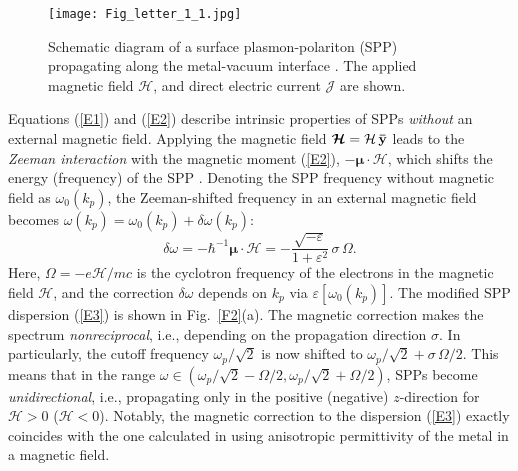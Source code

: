 \documentclass[9pt,twocolumn,twoside]{osajnl}
\begin{document}
\begin{figure}[t]
\centering
\texttt{[image: Fig\_letter\_1\_1.jpg]}
\caption{Schematic diagram of a surface plasmon-polariton (SPP) propagating along the metal-vacuum interface \cite{Zayats,Maier}. The applied magnetic field ${\bm{\mathcal H}}$, and direct electric current ${\bm{\mathcal J}}$ are shown.}
\label{F1}
\end{figure}

Equations (\ref{E1}) and (\ref{E2}) describe intrinsic properties of SPPs {\it without} an external magnetic field. Applying the magnetic field ${{\bm{\mathcal H}}} = {\mathcal H}\,{\bf{\bar y}}$ leads to the {\it Zeeman interaction} with the magnetic moment (\ref{E2}), $- \bm{\mu}  \cdot {{\bm{\mathcal H}}}$, which shifts the energy (frequency) of the SPP \cite{QM}. Denoting the SPP frequency without magnetic field as ${\omega _0}\!\left( {{k_p}} \right)$, the Zeeman-shifted frequency in an external magnetic field becomes $\omega\! \left( {{k_p}} \right) = {\omega _0}\!\left( {{k_p}} \right) + \delta \omega\! \left( {{k_p}} \right)$:
%
\begin{equation}
\delta \omega  =  - {\hbar ^{ - 1}} \bm{\mu}  \cdot {{\bm{\mathcal H}}} =  - \frac{{\sqrt { - \varepsilon } }}{{1 + {\varepsilon ^2}}}\, \sigma\, \Omega .
\label{E3}
\end{equation}
%
Here, $\Omega  =  - e {\mathcal H}/m c$ is the cyclotron frequency of the electrons in the magnetic field ${\mathcal H}$, and the correction $\delta\omega$ depends on $k_p$ via $\varepsilon \left[ {{\omega _0}\!\left( {{k_p}} \right)} \right]$. The modified SPP dispersion (\ref{E3}) is shown in Fig.~\ref{F2}(a). The magnetic correction makes the spectrum {\it nonreciprocal}, i.e., depending on the propagation direction $\sigma$. In particularly, the cutoff frequency ${\omega _p}/\sqrt 2$ is now shifted to ${\omega _p}/\sqrt 2  + \sigma \, \Omega /2$. This means that in the range $\omega  \in \left( {{\omega _p}/\sqrt 2  - \Omega /2,{\omega _p}/\sqrt 2  + \Omega /2} \right)$, SPPs become {\it unidirectional}, i.e., propagating only in the positive (negative) $z$-direction for ${\mathcal H} >0$ (${\mathcal H} <0$). Notably, the magnetic correction to the dispersion (\ref{E3}) exactly coincides with the one calculated in \cite{Yu2008} using anisotropic permittivity of the metal in a magnetic field.
\end{document}
